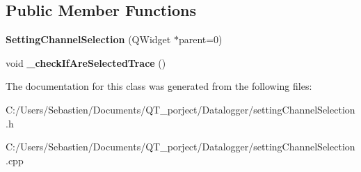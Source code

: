 \subsection*{Public Member Functions}
\begin{DoxyCompactItemize}
\item 
\mbox{\label{class_setting_channel_selection_a80d823bd31186c4b4413b1ae0904b5b9}} 
{\bfseries Setting\+Channel\+Selection} (Q\+Widget $\ast$parent=0)
\item 
\mbox{\label{class_setting_channel_selection_ae78dd0ff5a704d28a4b5d9e7822ccc39}} 
void {\bfseries \+\_\+check\+If\+Are\+Selected\+Trace} ()
\end{DoxyCompactItemize}


The documentation for this class was generated from the following files\+:\begin{DoxyCompactItemize}
\item 
C\+:/\+Users/\+Sebastien/\+Documents/\+Q\+T\+\_\+porject/\+Datalogger/setting\+Channel\+Selection.\+h\item 
C\+:/\+Users/\+Sebastien/\+Documents/\+Q\+T\+\_\+porject/\+Datalogger/setting\+Channel\+Selection.\+cpp\end{DoxyCompactItemize}
